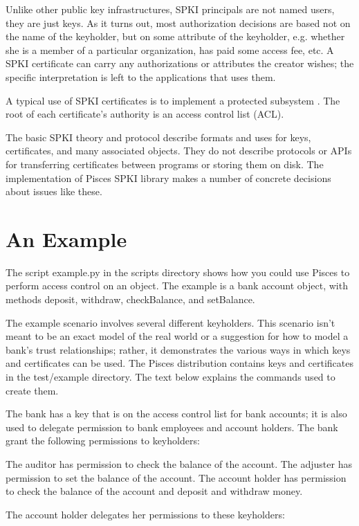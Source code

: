 \documentclass{howto}
\begin{document}
Unlike other public key infrastructures, SPKI principals are not named
users, they are just keys.  As it turns out, most authorization
decisions are based not on the name of the keyholder, but on some
attribute of the keyholder, e.g. whether she is a member of a
particular organization, has paid some access fee, etc.  A SPKI
certificate can carry any authorizations or attributes the creator
wishes; the specific interpretation is left to the applications that
uses them.

A typical use of SPKI certificates is to implement a protected
subsystem \cite{saltzer75}.  The root of each certificate's authority
is an access control list (ACL).

The basic SPKI theory and protocol describe formats and uses for keys,
certificates, and many associated objects.  They do not describe
protocols or APIs for transferring certificates between programs or
storing them on disk.  The implementation of Pisces SPKI library makes
a number of concrete decisions about issues like these.

\section{An Example}

The script example.py in the scripts directory shows how you could use 
Pisces to perform access control on an object.  The example is a bank
account object, with methods deposit, withdraw, checkBalance, and
setBalance.

The example scenario involves several different keyholders.  This
scenario isn't meant to be an exact model of the real world or a
suggestion for how to model a bank's trust relationships; rather, it
demonstrates the various ways in which keys and certificates can be
used.  The Pisces distribution contains keys and certificates in the
test/example directory.  The text below explains the commands used to
create them.

The bank has a key that is on the access control list for bank
accounts; it is also used to delegate permission to bank employees and
account holders.  The bank grant the following permissions to
keyholders:

The auditor has permission to check the balance of the account.
The adjuster has permission to set the balance of the account.
The account holder has permission to check the balance of the account
and deposit and withdraw money.

The account holder delegates her permissions to these keyholders:
\end{document}
